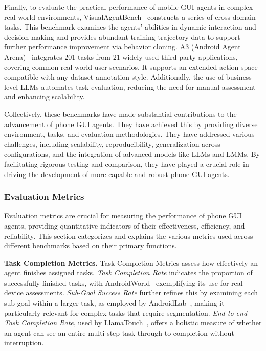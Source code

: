 Finally, to evaluate the practical performance of mobile GUI agents in complex real-world environments, VisualAgentBench~\cite{liu2024visualagentbench} constructs a series of cross-domain tasks. This benchmark examines the agents' abilities in dynamic interaction and decision-making and provides abundant training trajectory data to support further performance improvement via behavior cloning. A3 (Android Agent Arena)~\cite{chai2025a3} integrates 201 tasks from 21 widely-used third-party applications, covering common real-world user scenarios. It supports an extended action space compatible with any dataset annotation style. Additionally, the use of business-level LLMs automates task evaluation, reducing the need for manual assessment and enhancing scalability.


Collectively, these benchmarks have made substantial contributions to the advancement of phone GUI agents. They have achieved this by providing diverse environment, tasks, and evaluation methodologies. They have addressed various challenges, including scalability, reproducibility, generalization across configurations, and the integration of advanced models like LLMs and LMMs. By facilitating rigorous testing and comparison, they have played a crucial role in driving the development of more capable and robust phone GUI agents.

\subsubsection{Evaluation Metrics}
\label{subsec:eval_metrics}

Evaluation metrics are crucial for measuring the performance of phone GUI agents, providing quantitative indicators of their effectiveness, efficiency, and reliability. This section categorizes and explains the various metrics used across different benchmarks based on their primary functions.

\noindent\textbf{Task Completion Metrics.}
Task Completion Metrics assess how effectively an agent finishes assigned tasks. \emph{Task Completion Rate} indicates the proportion of successfully finished tasks, with AndroidWorld~\cite{rawles2024androidworld} exemplifying its use for real-device assessments. \emph{Sub-Goal Success Rate} further refines this by examining each sub-goal within a larger task, as employed by AndroidLab~\cite{xu2024androidlab}, making it particularly relevant for complex tasks that require segmentation. \emph{End-to-end Task Completion Rate}, used by LlamaTouch~\cite{zhang2024llamatouch}, offers a holistic measure of whether an agent can see an entire multi-step task through to completion without interruption.

